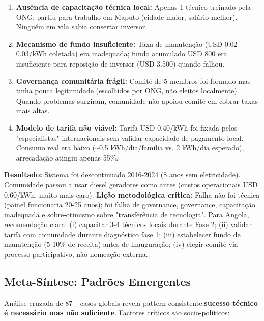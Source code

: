 \documentclass[12pt, a4paper]{article}
\begin{document}
\begin{enumerate}
\item\textbf{Ausência de capacitação técnica local:} Apenas 1 técnico treinado pela ONG; partiu para trabalho em Maputo (cidade maior, salário melhor). Ninguém em vila sabia consertar inversor.
\item\textbf{Mecanismo de fundo insuficiente:} Taxa de manutenção (USD 0.02-0.03/kWh coletada) era inadequada; fundo acumulado USD 800 era insuficiente para reposição de inversor (USD 3.500) quando falhou.
\item\textbf{Governança comunitária frágil:} Comité de 5 membros foi formado mas tinha pouca legitimidade (escolhidos por ONG, não eleitos localmente). Quando problemas surgiram, comunidade não apoiou comité em cobrar taxas mais altas.
\item\textbf{Modelo de tarifa não viável:} Tarifa USD 0.40/kWh foi fixada pelos "especialistas" internacionais sem validar capacidade de pagamento local. Consumo real era baixo (\textasciitilde{}0.5 kWh/dia/família vs. 2 kWh/dia esperado), arrecadação atingiu apenas 55\%.
\end{enumerate}
\textbf{Resultado:} Sistema foi descontinuado 2016-2024 (8 anos sem eletricidade). Comunidade passou a usar diesel geradores como antes (custos operacionais USD 0.60/kWh, muito mais caro).
\textbf{Lição metodológica crítica:} Falha não foi técnica (painel funcionaria 20-25 anos); foi falha de governance, governance, capacitação inadequada e sobre-otimismo sobre "transferência de tecnologia". Para Angola, recomendação clara: (i) capacitar 3-4 técnicos locais durante Fase 2; (ii) validar tarifa com comunidade durante diagnóstico fase 1; (iii) estabelecer fundo de manutenção (5-10\% de receita) antes de inauguração; (iv) elegir comité via processo participativo, não nomeação externa.

\subsection{Meta-Síntese: Padrões Emergentes}

Análise cruzada de 87+ casos globais revela pattern consistente:\textbf{sucesso técnico é necessário mas não suficiente}. Factores críticos são socio-políticos:
\end{document}
